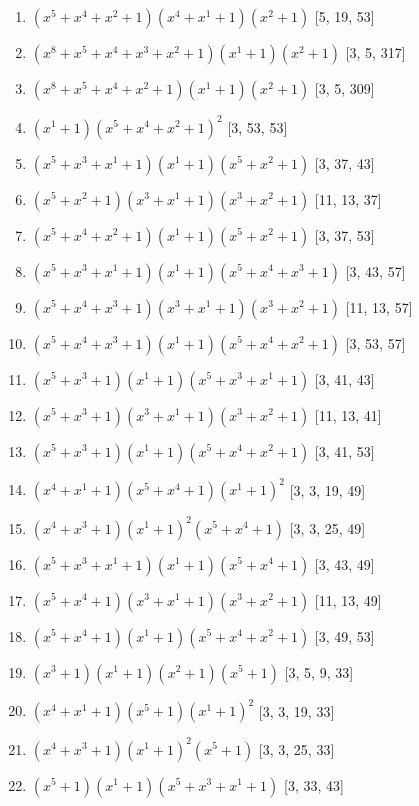 \documentclass[10pt,twocolumn]{article}
\begin{document}
\begin{enumerate}
\item $(x^{5} + x^{4} + x^{2} + 1)(x^{4} + x^{1} + 1)(x^{2} + 1)$  [5, 19, 53]
\item $(x^{8} + x^{5} + x^{4} + x^{3} + x^{2} + 1)(x^{1} + 1)(x^{2} + 1)$  [3, 5, 317]
\item $(x^{8} + x^{5} + x^{4} + x^{2} + 1)(x^{1} + 1)(x^{2} + 1)$  [3, 5, 309]
\item $(x^{1} + 1)(x^{5} + x^{4} + x^{2} + 1)^{2}$  [3, 53, 53]
\item $(x^{5} + x^{3} + x^{1} + 1)(x^{1} + 1)(x^{5} + x^{2} + 1)$  [3, 37, 43]
\item $(x^{5} + x^{2} + 1)(x^{3} + x^{1} + 1)(x^{3} + x^{2} + 1)$  [11, 13, 37]
\item $(x^{5} + x^{4} + x^{2} + 1)(x^{1} + 1)(x^{5} + x^{2} + 1)$  [3, 37, 53]
\item $(x^{5} + x^{3} + x^{1} + 1)(x^{1} + 1)(x^{5} + x^{4} + x^{3} + 1)$  [3, 43, 57]
\item $(x^{5} + x^{4} + x^{3} + 1)(x^{3} + x^{1} + 1)(x^{3} + x^{2} + 1)$  [11, 13, 57]
\item $(x^{5} + x^{4} + x^{3} + 1)(x^{1} + 1)(x^{5} + x^{4} + x^{2} + 1)$  [3, 53, 57]
\item $(x^{5} + x^{3} + 1)(x^{1} + 1)(x^{5} + x^{3} + x^{1} + 1)$  [3, 41, 43]
\item $(x^{5} + x^{3} + 1)(x^{3} + x^{1} + 1)(x^{3} + x^{2} + 1)$  [11, 13, 41]
\item $(x^{5} + x^{3} + 1)(x^{1} + 1)(x^{5} + x^{4} + x^{2} + 1)$  [3, 41, 53]
\item $(x^{4} + x^{1} + 1)(x^{5} + x^{4} + 1)(x^{1} + 1)^{2}$  [3, 3, 19, 49]
\item $(x^{4} + x^{3} + 1)(x^{1} + 1)^{2}(x^{5} + x^{4} + 1)$  [3, 3, 25, 49]
\item $(x^{5} + x^{3} + x^{1} + 1)(x^{1} + 1)(x^{5} + x^{4} + 1)$  [3, 43, 49]
\item $(x^{5} + x^{4} + 1)(x^{3} + x^{1} + 1)(x^{3} + x^{2} + 1)$  [11, 13, 49]
\item $(x^{5} + x^{4} + 1)(x^{1} + 1)(x^{5} + x^{4} + x^{2} + 1)$  [3, 49, 53]
\item $(x^{3} + 1)(x^{1} + 1)(x^{2} + 1)(x^{5} + 1)$  [3, 5, 9, 33]
\item $(x^{4} + x^{1} + 1)(x^{5} + 1)(x^{1} + 1)^{2}$  [3, 3, 19, 33]
\item $(x^{4} + x^{3} + 1)(x^{1} + 1)^{2}(x^{5} + 1)$  [3, 3, 25, 33]
\item $(x^{5} + 1)(x^{1} + 1)(x^{5} + x^{3} + x^{1} + 1)$  [3, 33, 43]

\end{enumerate}
\end{document}
